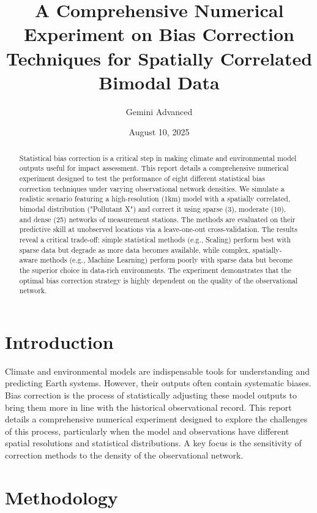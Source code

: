 \documentclass[11pt, a4paper]{article}
\title{\textbf{A Comprehensive Numerical Experiment on Bias Correction Techniques for Spatially Correlated Bimodal Data}}
\author{Gemini Advanced}
\date{August 10, 2025}
\begin{document}
\maketitle

\begin{abstract}
\noindent Statistical bias correction is a critical step in making climate and environmental model outputs useful for impact assessment. This report details a comprehensive numerical experiment designed to test the performance of eight different statistical bias correction techniques under varying observational network densities. We simulate a realistic scenario featuring a high-resolution (1km) model with a spatially correlated, bimodal distribution ("Pollutant X") and correct it using sparse (3), moderate (10), and dense (25) networks of measurement stations. The methods are evaluated on their predictive skill at unobserved locations via a leave-one-out cross-validation. The results reveal a critical trade-off: simple statistical methods (e.g., Scaling) perform best with sparse data but degrade as more data becomes available, while complex, spatially-aware methods (e.g., Machine Learning) perform poorly with sparse data but become the superior choice in data-rich environments. The experiment demonstrates that the optimal bias correction strategy is highly dependent on the quality of the observational network.
\end{abstract}

\section{Introduction}

Climate and environmental models are indispensable tools for understanding and predicting Earth systems. However, their outputs often contain systematic biases. Bias correction is the process of statistically adjusting these model outputs to bring them more in line with the historical observational record. This report details a comprehensive numerical experiment designed to explore the challenges of this process, particularly when the model and observations have different spatial resolutions and statistical distributions. A key focus is the sensitivity of correction methods to the density of the observational network.

\section{Methodology}
\end{document}
